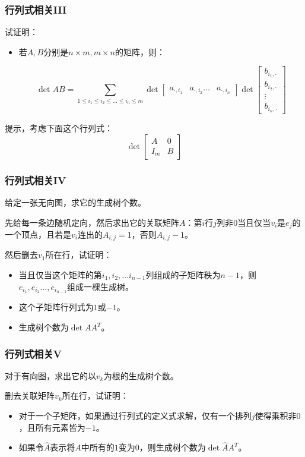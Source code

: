 \documentclass[10pt]{beamer}
\begin{document}
	\begin{frame}
		\frametitle{行列式相关III}
	
		试证明：
		
		\begin{itemize}
			\item 若$A,B$分别是$n\times m,m\times n$的矩阵，则：
			
			$$
			\det AB=\sum_{1\le i_1\le i_2\le \dots \le i_n\le m} \det \begin{bmatrix}a_{\cdot,i_1}&a_{\cdot,i_2}\dots&a_{\cdot,i_n}\end{bmatrix}\det \begin{bmatrix}b_{i_1,\cdot}\\b_{i_2,\cdot}\\\vdots\\b_{i_n,\cdot}\end{bmatrix}
			$$
		\end{itemize}


		提示，考虑下面这个行列式：
		$$
		\det \begin{bmatrix}A&0\\I_m&B\end{bmatrix}
		$$
	
	\end{frame}
	\begin{frame}
		\frametitle{行列式相关IV}
	
		给定一张无向图，求它的生成树个数。

		\onslide<2->

		先给每一条边随机定向，然后求出它的关联矩阵$A$：第$i$行$j$列非$0$当且仅当$v_i$是$e_j$的一个顶点，且若是$v_i$连出的$A_{i,j}=1$，否则$A_{i,j}-1$。
		
		然后删去$v_1$所在行，试证明：

		\begin{itemize}
			\item 当且仅当这个矩阵的第$i_1,i_2,\dots i_{n-1}$列组成的子矩阵秩为$n-1$，则$e_{i_1},e_{i_2}\dots,e_{i_{n-1}}$组成一棵生成树。
			\item 这个子矩阵行列式为$1$或$-1$。
			\item 生成树个数为$\det AA^T$。
		\end{itemize}

	\end{frame}
	\begin{frame}
		\frametitle{行列式相关V}
	
		对于有向图，求出它的以$v_k$为根的生成树个数。


		删去关联矩阵$v_k$所在行，试证明：

		\begin{itemize}
			\item 对于一个子矩阵，如果通过行列式的定义式求解，仅有一个排列$j$使得乘积非$0$，且所有元素皆为$-1$。
			\item 如果令$\hat A$表示将$A$中所有的$1$变为$0$，则生成树个数为$\det \hat AA^T$。
		\end{itemize}
	
	\end{frame}
\end{document}
